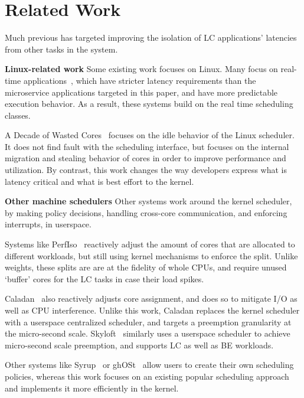 \section{Related Work}

Much previous has targeted improving the isolation of LC applications' latencies
from other tasks in the system.

\textbf{Linux-related work} Some existing work focuses on Linux. Many focus on
real-time applications~\cite{rt-in-linux, state-rt-linux}, which have stricter
latency requirements than the microservice applications targeted in this paper,
and have more predictable execution behavior. As a result, these systems build
on the real time scheduling classes.

A Decade of Wasted Cores~\cite{wasted-cores} focuses on the idle behavior of the
Linux scheduler. It does not find fault with the scheduling interface, but
focuses on the internal migration and stealing behavior of cores in order to
improve performance and utilization. By contrast, this work changes the way
developers express what is latency critical and what is best effort to the
kernel.

\textbf{Other machine schedulers} Other systems work around the kernel
scheduler, by making policy decisions, handling cross-core communication, and
enforcing interrupts, in userspace.

Systems like PerfIso~\cite{perfiso} reactively adjust the amount of cores that
are allocated to different workloads, but still using kernel mechanisms to
enforce the split. Unlike \cgroups{} weights, these splits are are at the
fidelity of whole CPUs, and require unused `buffer' cores for the LC tasks in
case their load spikes.

Caladan~\cite{caladan} also reactively adjusts core assignment, and does so to
mitigate I/O as well as CPU interference. Unlike this work, Caladan replaces the
kernel scheduler with a userspace centralized scheduler, and targets a
preemption granularity at the micro-second scale. Skyloft~\cite{skyloft}
similarly uses a userspace scheduler to achieve micro-second scale preemption,
and supports LC as well as BE workloads.

Other systems like Syrup~\cite{syrup} or ghOSt~\cite{ghost} allow users to
create their own scheduling policies, whereas this work focuses on an existing
popular scheduling approach and implements it more efficiently in the kernel. 



